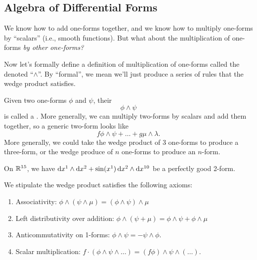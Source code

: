 \subsection{Algebra of Differential Forms}

\M
We know how to add one-forms together, and we know how to multiply
one-forms by ``scalars'' (i.e., smooth functions). But what about the
multiplication of one-forms \emph{by other one-forms?}

Now let's formally define a definition of multiplication of one-forms
called the  denoted ``$\wedge$''. By ``formal'',
we mean we'll just produce a series of rules that the wedge product
satisfies.

Given two one-forms $\phi$ and $\psi$, their 
\begin{equation}
\phi\wedge\psi
\end{equation}
is called a . More generally, we can multiply two-forms
by scalars and add them together, so a generic two-form looks like
\begin{equation}
f\phi\wedge\psi+\dots+g\mu\wedge\lambda.
\end{equation}
More generally, we could take the wedge product of 3 one-forms to
produce a three-form, or the wedge produce of $n$ one-forms to produce
an $n$-form.

\begin{example}
On $\mathbb{R}^{15}$, we have $\mathrm{d} x^{1}\wedge\mathrm{d} x^{2}+\sin(x^{1})\,\mathrm{d} x^{2}\wedge\mathrm{d} x^{10}$
be a perfectly good 2-form.
\end{example}

\label{sec:introduction:axioms-of-wedge-product}
We stipulate the wedge product satisfies the following axioms:
\begin{enumerate}
\item Associativity: $\phi\wedge(\psi\wedge\mu)=(\phi\wedge\psi)\wedge\mu$
\item Left distributivity over addition: $\phi\wedge(\psi+\mu) = \phi\wedge\psi+\phi\wedge\mu$
\item Anticommutativity on 1-forms: $\phi\wedge\psi=-\psi\wedge\phi$.
\item Scalar multiplication: $f\cdot(\phi\wedge\psi\wedge\dots)=(f\phi)\wedge\psi\wedge(\dots)$.
\end{enumerate}

